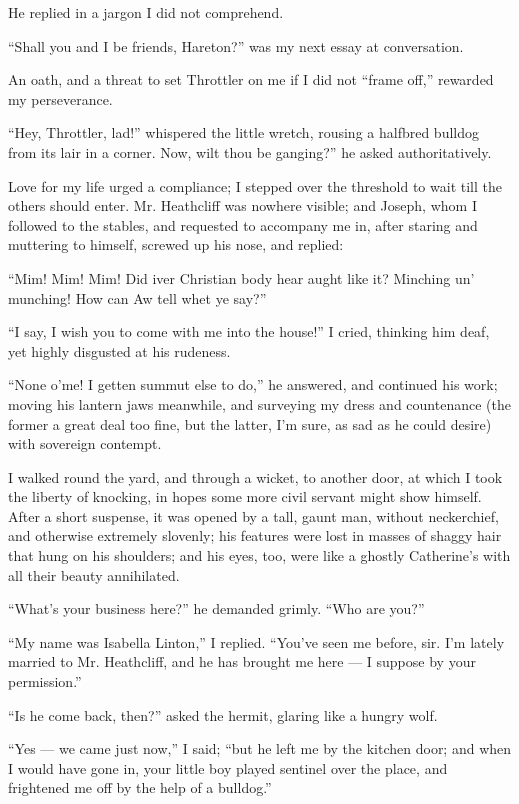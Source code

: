 \par He replied in a jargon I did not comprehend.
\par “Shall you and I be friends, Hareton?” was my next essay at conversation.
\par An oath, and a threat to set Throttler on me if I did not “frame off,” rewarded my perseverance.
\par “Hey, Throttler, lad!” whispered the little wretch, rousing a halfbred bulldog from its lair in a corner. Now, wilt thou be ganging?” he asked authoritatively.
\par Love for my life urged a compliance; I stepped over the threshold to wait till the others should enter. Mr. Heathcliff was nowhere visible; and Joseph, whom I followed to the stables, and requested to accompany me in, after staring and muttering to himself, screwed up his nose, and replied:
\par “Mim! Mim! Mim! Did iver Christian body hear aught like it? Minching un' munching! How can Aw tell whet ye say?”
\par “I say, I wish you to come with me into the house!” I cried, thinking him deaf, yet highly disgusted at his rudeness.
\par “None o'me! I getten summut else to do,” he answered, and continued his work; moving his lantern jaws meanwhile, and surveying my dress and countenance (the former a great deal too fine, but the latter, I'm sure, as sad as he could desire) with sovereign contempt.
\par I walked round the yard, and through a wicket, to another door, at which I took the liberty of knocking, in hopes some more civil servant might show himself. After a short suspense, it was opened by a tall, gaunt man, without neckerchief, and otherwise extremely slovenly; his features were lost in masses of shaggy hair that hung on his shoulders; and his eyes, too, were like a ghostly Catherine's with all their beauty annihilated.
\par “What's your business here?” he demanded grimly. “Who are you?”
\par “My name was Isabella Linton,” I replied. “You've seen me before, sir. I'm lately married to Mr. Heathcliff, and he has brought me here — I suppose by your permission.”
\par “Is he come back, then?” asked the hermit, glaring like a hungry wolf.
\par “Yes — we came just now,” I said; “but he left me by the kitchen door; and when I would have gone in, your little boy played sentinel over the place, and frightened me off by the help of a bulldog.”

